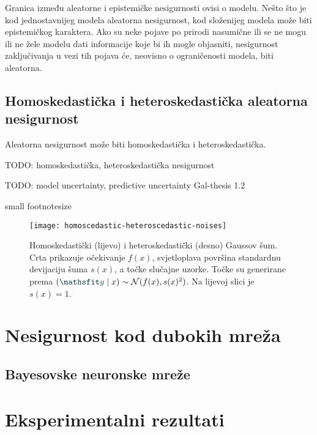 \documentclass[utf8, diplomski, lmodern]{fer}
\begin{document}
Granica između aleatorne i epistemičke nesigurnosti ovisi o modelu. Nešto što je kod jednostavnijeg modela aleatorna nesigurnost, kod složenijeg modela može biti epistemičkog karaktera. Ako su neke pojave po prirodi nasumične ili se ne mogu ili ne žele modelu dati informacije koje bi ih mogle objasniti, nesigurnost zaključivanja u vezi tih pojava će, neovisno o ograničenosti modela, biti aleatorna.

\section{Homoskedastička i heteroskedastička aleatorna nesigurnost}

Aleatorna nesigurnost može biti homoskedastička i heteroskedastička.

TODO: homoskedastička, heteroskedastička nesigurnost

TODO: model uncertainty, predictive uncertainty Gal-thesis 1.2

\the{}\font\newline %
\the{}\font\newline %
small {\small \the{}\font\newline} %
footnotesize {\footnotesize \the{}\font\newline} %
\the\textwidth
		
\begin{figure}
	\centering
	\texttt{[image: homoscedastic-heteroscedastic-noises]}
	\caption{Homoskedastički (lijevo) i heteroskedastički (desno) Gaussov šum.  Crta prikazuje očekivanje $f(x)$, svjetloplava površina standardnu devijaciju šuma $s(x)$, a točke slučajne uzorke. Točke su generirane prema $(\rvar y\mid x) \sim \mathcal{N}(f(x),s(x)^2)$. Na lijevoj slici je $s(x)=1$.}
	\label{fig:homoscedastic-heteroscedastic-noises}
\end{figure}
		
		

\chapter{Nesigurnost kod dubokih mreža}


\section{Bayesovske neuronske mreže}


\chapter{Eksperimentalni rezultati}
\end{document}
